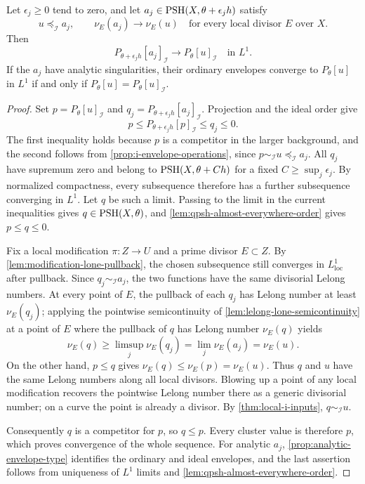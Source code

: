 \begin{proposition}\label{prop:ordered-ideal-envelope-convergence}
Let $\epsilon_j\geq0$ tend to zero, and let $a_j\in\mathrm{PSH}(X,\theta+\epsilon_jh)$ satisfy
\[
 u\preceq_{\mathcal I}a_j,\qquad
 \nu_E(a_j)\longrightarrow\nu_E(u)
 \quad\text{for every local divisor }E\text{ over }X.
\]
Then
\[
 P_{\theta+\epsilon_jh}[a_j]_{\mathcal I}
       \longrightarrow P_\theta[u]_{\mathcal I}
       \quad\text{in }L^1.
\]
If the $a_j$ have analytic singularities, their ordinary envelopes converge to $P_\theta[u]$ in $L^1$ if and only if $P_\theta[u]=P_\theta[u]_{\mathcal I}$.
\end{proposition}
\begin{proof}
Set $p=P_\theta[u]_{\mathcal I}$ and $q_j=P_{\theta+\epsilon_jh}[a_j]_{\mathcal I}$. Projection and the ideal order give
\[
 p\leq P_{\theta+\epsilon_jh}[p]_{\mathcal I}\leq q_j\leq0.
\]
The first inequality holds because $p$ is a competitor in the larger background, and the second follows from \cref{prop:i-envelope-operations}, since $p\sim_{\mathcal I}u\preceq_{\mathcal I}a_j$. All $q_j$ have supremum zero and belong to $\mathrm{PSH}(X,\theta+Ch)$ for a fixed $C\geq\sup_j\epsilon_j$. By normalized compactness, every subsequence therefore has a further subsequence converging in $L^1$. Let $q$ be such a limit. Passing to the limit in the current inequalities gives $q\in\mathrm{PSH}(X,\theta)$, and \cref{lem:qpsh-almost-everywhere-order} gives $p\leq q\leq0$.

Fix a local modification $\pi\colon Z\to U$ and a prime divisor $E\subset Z$. By \cref{lem:modification-lone-pullback}, the chosen subsequence still converges in $L^1_{\mathrm{loc}}$ after pullback. Since $q_j\sim_{\mathcal I}a_j$, the two functions have the same divisorial Lelong numbers. At every point of $E$, the pullback of each $q_j$ has Lelong number at least $\nu_E(q_j)$; applying the pointwise semicontinuity of \cref{lem:lelong-lone-semicontinuity} at a point of $E$ where the pullback of $q$ has Lelong number $\nu_E(q)$ yields
\[
 \nu_E(q)\geq\limsup_j\nu_E(q_j)
       =\lim_j\nu_E(a_j)=\nu_E(u).
\]
On the other hand, $p\leq q$ gives $\nu_E(q)\leq\nu_E(p)=\nu_E(u)$. Thus $q$ and $u$ have the same Lelong numbers along all local divisors. Blowing up a point of any local modification recovers the pointwise Lelong number there as a generic divisorial number; on a curve the point is already a divisor. By \cref{thm:local-i-inputs}, $q\sim_{\mathcal I}u$.

Consequently $q$ is a competitor for $p$, so $q\leq p$. Every cluster value is therefore $p$, which proves convergence of the whole sequence. For analytic $a_j$, \cref{prop:analytic-envelope-type} identifies the ordinary and ideal envelopes, and the last assertion follows from uniqueness of $L^1$ limits and \cref{lem:qpsh-almost-everywhere-order}.
\end{proof}

